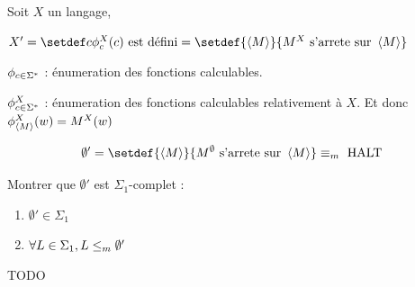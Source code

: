 \begin{definition}
	Soit $X$ un langage,

	$X' = \setdef c {\phi_c^X(c) \text{ est défini}} = \setdef {\encode M} {M^X \text{ s'arrete sur } \encode M}$

	$\phi_{c \in \Sigma^{*}}$ : énumeration des fonctions calculables.

	$\phi_{c \in \Sigma^{*}}^X$ : énumeration des fonctions calculables relativement à $X$. Et donc $\phi_{\left\langle M\right\rangle}^X(w) = M^X(w)$
\end{definition}


\begin{exemple}
	$$\emptyset' = \setdef {\encode M} {M^{\emptyset} \text{ s'arrete sur } \encode M} \equivm \halt$$
\end{exemple}

\begin{exercice}
	Montrer que $\emptyset '$ est $\Sigma_1$-complet :
	\begin{enumerate}
		\item $\emptyset' \in \Sigma_1$
		\item $\forall L \in \Sigma_1, L \leq_m \emptyset'$
	\end{enumerate}
\end{exercice}

TODO
